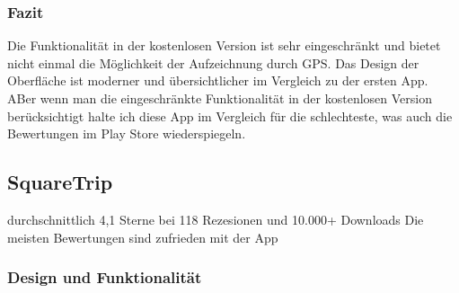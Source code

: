 \documentclass[a4paper]{article}
\begin{document}
\subsubsection{Fazit}
Die Funktionalität in der kostenlosen Version ist sehr eingeschränkt und bietet nicht einmal die
Möglichkeit der Aufzeichnung durch GPS. Das Design der Oberfläche ist moderner und übersichtlicher
im Vergleich zu der ersten App. ABer wenn man die eingeschränkte Funktionalität in der kostenlosen
Version berücksichtigt halte ich diese App im Vergleich für die schlechteste, was auch die Bewertungen
im Play Store wiederspiegeln.

\subsection{SquareTrip}
durchschnittlich 4,1 Sterne bei 118 Rezesionen und 10.000+ Downloads
Die meisten Bewertungen sind zufrieden mit der App

\subsubsection{Design und Funktionalität}
\end{document}
